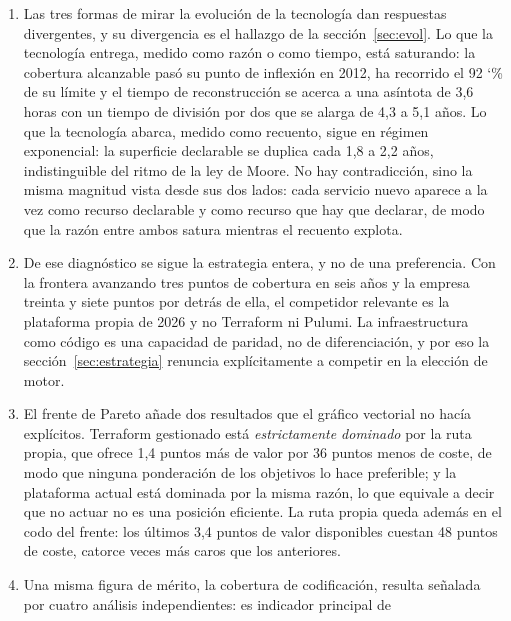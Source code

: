 \documentclass[11pt,letterpaper]{article}
\newcommand{\pct}{\char`\%}  %
\begin{document}
\begin{enumerate}
    política como código, y no dispone de instrumentos para romperlo; la
    ampliación en detalle del modelo OPM lo rompe al partir el proceso en
    planificación, validación y aplicación. La matriz encuentra el problema y
    el modelo aporta la partición que lo resuelve.
  \item Las tres formas de mirar la evolución de la tecnología dan
    respuestas divergentes, y su divergencia es el hallazgo de la
    sección~\ref{sec:evol}. Lo que la tecnología entrega, medido como razón o
    como tiempo, está saturando: la cobertura alcanzable pasó su punto de
    inflexión en 2012, ha recorrido el 92 \pct{} de su límite y el tiempo de
    reconstrucción se acerca a una asíntota de 3,6 horas con un tiempo de
    división por dos que se alarga de 4,3 a 5,1 años. Lo que la tecnología
    abarca, medido como recuento, sigue en régimen exponencial: la superficie
    declarable se duplica cada 1,8 a 2,2 años, indistinguible del ritmo de la
    ley de Moore. No hay contradicción, sino la misma magnitud vista desde sus
    dos lados: cada servicio nuevo aparece a la vez como recurso declarable y
    como recurso que hay que declarar, de modo que la razón entre ambos
    satura mientras el recuento explota.
  \item De ese diagnóstico se sigue la estrategia entera, y no de una
    preferencia. Con la frontera avanzando tres puntos de cobertura en seis
    años y la empresa treinta y siete puntos por detrás de ella, el
    competidor relevante es la plataforma propia de 2026 y no Terraform ni
    Pulumi. La infraestructura como código es una capacidad de paridad, no de
    diferenciación, y por eso la sección~\ref{sec:estrategia} renuncia
    explícitamente a competir en la elección de motor.
  \item El frente de Pareto añade dos resultados que el gráfico vectorial no
    hacía explícitos. Terraform gestionado está \emph{estrictamente dominado}
    por la ruta propia, que ofrece 1,4 puntos más de valor por 36 puntos menos
    de coste, de modo que ninguna ponderación de los objetivos lo hace
    preferible; y la plataforma actual está dominada por la misma razón, lo
    que equivale a decir que no actuar no es una posición eficiente. La ruta
    propia queda además en el codo del frente: los últimos 3,4 puntos de valor
    disponibles cuestan 48 puntos de coste, catorce veces más caros que los
    anteriores.
  \item Una misma figura de mérito, la cobertura de codificación, resulta
    señalada por cuatro análisis independientes: es indicador principal de

\end{enumerate}
\end{document}
